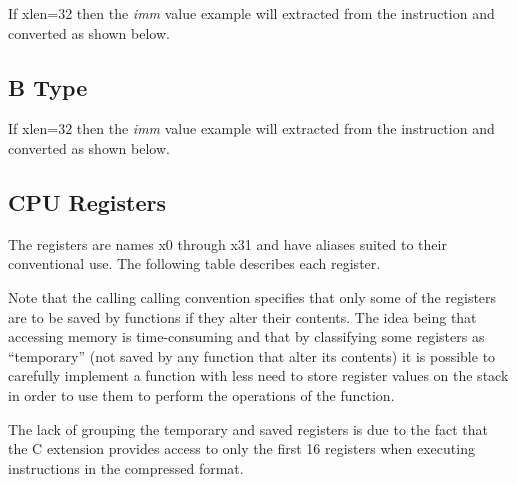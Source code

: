 If \Gls{xlen}=32 then the {\em imm} value example will extracted from the instruction
and converted as shown below.

\label{imm.s:decode}\DrawInsnOpSTypeDecoding

\subsection{B Type}
\label{insnformat:btype}

If \Gls{xlen}=32 then the {\em imm} value example will extracted from the instruction
and converted as shown below.

\label{imm.b:decode}\DrawInsnOpBTypeDecoding






\subsection{CPU Registers}
\label{cpuregs}

The registers are names x0 through x31 and have aliases suited to their 
conventional use.  The following table describes each register.  

Note 
that the calling calling convention specifies that only some 
of the registers are to be saved by functions if they alter their contents.
The idea being that accessing memory is time-consuming and that by
classifying some registers as ``temporary'' (not saved by any function
that alter its contents) it is possible to carefully implement a function
with less need to store register values on the stack in order to use them
to perform the operations of the function.

The lack of grouping the temporary and saved registers is due to the
fact that the C extension %
provides access to only the first 16 registers when executing instructions 
in the compressed format.  


